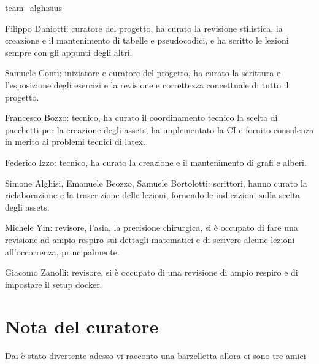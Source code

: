 \documentclass[class=book, crop=false, oneside, 12pt]{standalone}
\begin{document}
\begin{labeling}{team\_alghisius}
    \item[p!ps] Filippo Daniotti: curatore del progetto, ha curato la revisione stilistica, la creazione e il mantenimento di tabelle e pseudocodici, e ha scritto le lezioni sempre con gli appunti degli altri.
    \item[sam4retas] Samuele Conti: iniziatore e curatore del progetto, ha curato la scrittura e l'esposizione degli esercizi e la revisione e correttezza concettuale di tutto il progetto.
    \item[frab0zzo] Francesco Bozzo: tecnico, ha curato il coordinamento tecnico la scelta di pacchetti per la creazione degli assets, ha implementato la CI e fornito consulenza in merito ai problemi tecnici di latex.
    \item[f1zzo] Federico Izzo: tecnico, ha curato la creazione e il mantenimento di grafi e alberi.
    \item[team\_algh1sius] Simone Alghisi, Emanuele Beozzo, Samuele Bortolotti: scrittori, hanno curato la rielaborazione e la trascrizione delle lezioni, fornendo le indicazioni sulla scelta degli assets.
    \item[ch!n4] Michele Yin: revisore, l'asia, la precisione chirurgica, si è occupato di fare una revisione ad ampio respiro sui dettagli matematici e di scrivere alcune lezioni all'occorrenza, principalmente.
    \item[j4bb] Giacomo Zanolli: revisore, si è occupato di una revisione di ampio respiro e di impostare il setup docker. 
\end{labeling}  

\section*{Nota del curatore}
Dai è stato divertente adesso vi racconto una barzelletta allora ci sono tre amici
\end{document}
